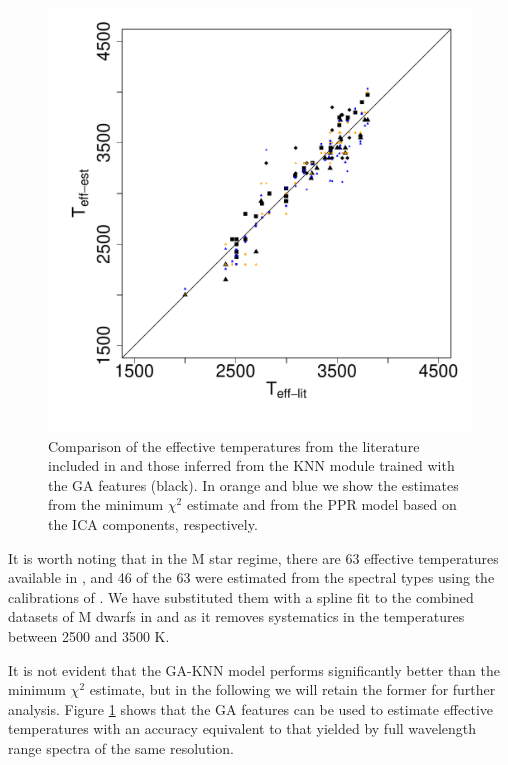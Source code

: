 \begin {figure}
 \centering
  \includegraphics[scale=0.45]{figs/irtf-teffs-literature.pdf}
  
  \caption{Comparison of the effective temperatures from the
  literature included in \cite{cesetti} and those inferred from the
  KNN module trained with the GA features (black). In orange and blue
  we show the estimates from the minimum $\chi^2$ estimate and from
  the PPR model based on the ICA components, respectively.}

\label{fig:irtf-teff}
\end {figure}

It is worth noting that in the M star regime, there are 63 effective
temperatures available in \cite{cesetti}, and 46 of the 63 were
estimated from the spectral types using the calibrations
of \cite{1996imsa.book.....O}. We have substituted them with a spline
fit to the combined datasets of M dwarfs in \cite{2013A&A...556A..15R}
and \cite{2012ApJ...757..112B} as it removes systematics in the
temperatures between 2500 and 3500 K.

It is not evident that the GA-KNN model performs significantly better
than the minimum $\chi^2$ estimate, but in the following we will
retain the former for further analysis. Figure \ref{fig:irtf-teff}
shows that the GA features can be used to estimate effective
temperatures with an accuracy equivalent to that yielded by full
wavelength range spectra of the same resolution.


